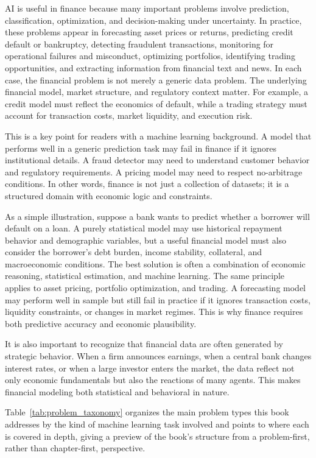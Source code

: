 \documentclass[../ai_in_finance]{subfiles}
\begin{document}
AI is useful in finance because many important problems involve prediction, classification, optimization, and decision-making under uncertainty. In practice, these problems appear in forecasting asset prices or returns, predicting credit default or bankruptcy, detecting fraudulent transactions, monitoring for operational failures and misconduct, optimizing portfolios, identifying trading opportunities, and extracting information from financial text and news. In each case, the financial problem is not merely a generic data problem. The underlying financial model, market structure, and regulatory context matter. For example, a credit model must reflect the economics of default, while a trading strategy must account for transaction costs, market liquidity, and execution risk.

This is a key point for readers with a machine learning background. A model that performs well in a generic prediction task may fail in finance if it ignores institutional details. A fraud detector may need to understand customer behavior and regulatory requirements. A pricing model may need to respect no-arbitrage conditions. In other words, finance is not just a collection of datasets; it is a structured domain with economic logic and constraints.

As a simple illustration, suppose a bank wants to predict whether a borrower will default on a loan. A purely statistical model may use historical repayment behavior and demographic variables, but a useful financial model must also consider the borrower’s debt burden, income stability, collateral, and macroeconomic conditions. The best solution is often a combination of economic reasoning, statistical estimation, and machine learning.
The same principle applies to asset pricing, portfolio optimization, and trading. A forecasting model may perform well in sample but still fail in practice if it ignores transaction costs, liquidity constraints, or changes in market regimes. This is why finance requires both predictive accuracy and economic plausibility.

It is also important to recognize that financial data are often generated by strategic behavior. When a firm announces earnings, when a central bank changes interest rates, or when a large investor enters the market, the data reflect not only economic fundamentals but also the reactions of many agents. This makes financial modeling both statistical and behavioral in nature.

Table~\ref{tab:problem_taxonomy} organizes the main problem types this book addresses by the kind of machine learning task involved and points to where each is covered in depth, giving a preview of the book's structure from a problem-first, rather than chapter-first, perspective.
\end{document}
